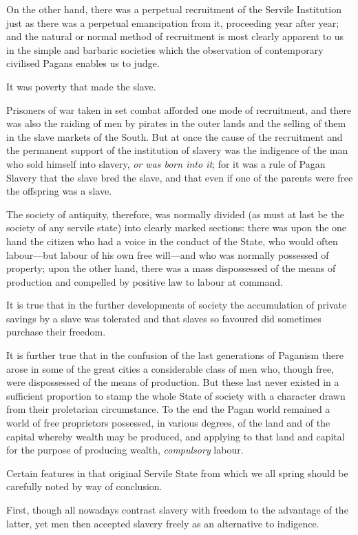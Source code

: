\documentclass{book}
\begin{document}
On the other hand, there was a perpetual recruitment of the Servile Institution just as there was a perpetual emancipation from it, proceeding year after year; and the natural or normal method of recruitment is most clearly apparent to us in the simple and barbaric societies which the observation of contemporary civilised Pagans enables us to judge.

It was poverty that made the slave.

Prisoners of war taken in set combat afforded one mode of recruitment, and there was also the raiding of men by pirates in the outer lands and the selling of them in the slave markets of the South. But at once the cause of the recruitment and the permanent support of the institution of slavery was the indigence of the man who sold himself into slavery, \emph{or was born into it}; for it was a rule of Pagan Slavery that the slave bred the slave, and that even if one of the parents were free the offspring was a slave.

The society of antiquity, therefore, was normally divided (as must at last be the society of any servile state) into clearly marked sections: there was upon the one hand the citizen who had a voice in the conduct of the State, who would often labour—but labour of his own free will—and who was normally possessed of property; upon the other hand, there was a mass dispossessed of the means of production and compelled by positive law to labour at command.

It is true that in the further developments of society the accumulation of private savings by a slave was tolerated and that slaves so favoured did sometimes purchase their freedom.

It is further true that in the confusion of the last generations of Paganism there arose in some of the great cities a considerable class of men who, though free, were dispossessed of the means of production. But these last never existed in a sufficient proportion to stamp the whole State of society with a character drawn from their proletarian circumstance. To the end the Pagan world remained a world of free proprietors possessed, in various degrees, of the land and of the capital whereby wealth may be produced, and applying to that land and capital for the purpose of producing wealth, \emph{compulsory} labour.

Certain features in that original Servile State from which we all spring should be carefully noted by way of conclusion.

First, though all nowadays contrast slavery with freedom to the advantage of the latter, yet men then accepted slavery freely as an alternative to indigence.
\end{document}

